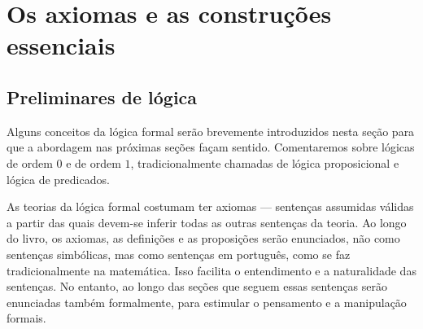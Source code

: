 \chapter{Os axiomas e as construções essenciais}

\section{Preliminares de lógica}

Alguns conceitos da lógica formal serão brevemente introduzidos nesta seção para que a abordagem nas próximas seções façam sentido. Comentaremos sobre lógicas de ordem $0$ e de ordem $1$, tradicionalmente chamadas de lógica proposicional e lógica de predicados.

As teorias da lógica formal costumam ter axiomas --- sentenças assumidas válidas a partir das quais devem-se inferir todas as outras sentenças da teoria. Ao longo do livro, os axiomas, as definições e as proposições serão enunciados, não como sentenças simbólicas, mas como sentenças em português, como se faz tradicionalmente na matemática. Isso facilita o entendimento e a naturalidade das sentenças. No entanto, ao longo das seções que seguem essas sentenças serão enunciadas também formalmente, para estimular o pensamento e a manipulação formais.

